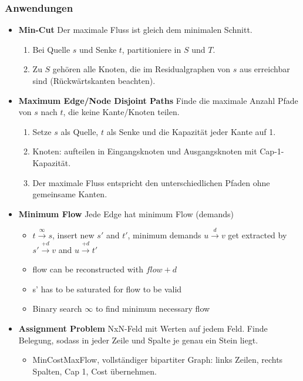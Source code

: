 \subsubsection{Anwendungen}
\begin{itemize}
	\item \textbf{Min-Cut}\newline
	Der maximale Fluss ist gleich dem minimalen Schnitt.
	\begin{enumerate}
		\item Bei Quelle $s$ und Senke $t$, partitioniere in $S$ und $T$.
		\item Zu $S$ gehören alle Knoten, die im Residualgraphen von $s$ aus erreichbar sind (Rückwärtskanten beachten).
	\end{enumerate}

	\item \textbf{Maximum Edge/Node Disjoint Paths}\newline
	Finde die maximale Anzahl Pfade von $s$ nach $t$, die keine Kante/Knoten teilen.
	\begin{enumerate}
		\item Setze $s$ als Quelle, $t$ als Senke und die Kapazität jeder Kante auf 1.
		\item Knoten: aufteilen in Eingangsknoten und Ausgangsknoten mit Cap-1-Kapazität.
		\item Der maximale Fluss entspricht den unterschiedlichen Pfaden ohne gemeinsame Kanten.
	\end{enumerate}

	\item \textbf{Minimum Flow}\newline
	Jede Edge hat minimum Flow (demands)
	\begin{itemize}
		\item $t \overset{\infty}\to s$, insert new $s'$ and $t'$, 
		minimum demands $u \overset{d}\to v$ get extracted by $s' \overset{+d}\to v$ and $u \overset{+d}\to t'$
		\item flow can be reconstructed with $flow + d$
		\item s' has to be saturated for flow to be valid
		\item Binary search $\infty$ to find minimum necessary flow
	\end{itemize}
	

	\item \textbf{Assignment Problem}
	NxN-Feld mit Werten auf jedem Feld. Finde Belegung, sodass in jeder Zeile und Spalte je genau ein Stein liegt.
	\begin{itemize}
		\item MinCostMaxFlow, vollständiger bipartiter Graph: links Zeilen, rechts Spalten, Cap 1, Cost übernehmen.
	\end{itemize}
\end{itemize}

